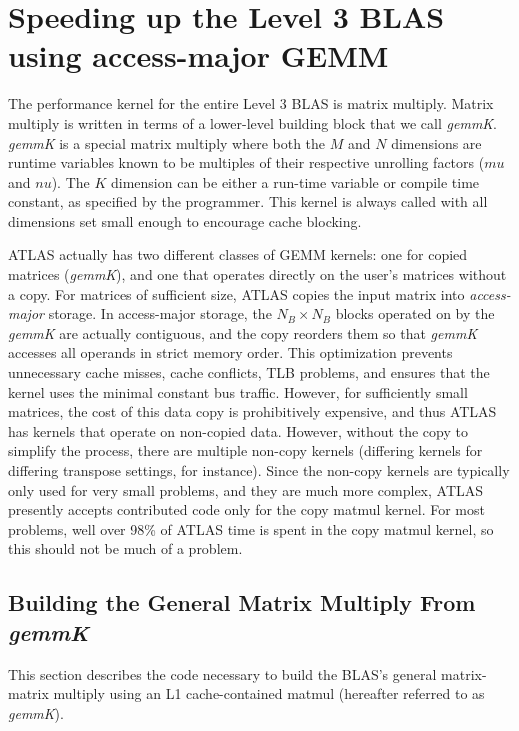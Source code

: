 \documentclass[11pt]{article}
\begin{document}
\section{Speeding up the Level 3 BLAS using access-major GEMM}

The performance kernel for the entire Level 3 BLAS is matrix multiply.
Matrix multiply is written in terms of a lower-level building block that
we call {\it gemmK}.  {\it gemmK} is a special matrix multiply where
both the $M$ and $N$ dimensions are runtime variables known to be multiples
of their respective unrolling factors ($mu$ and $nu$).  The $K$ dimension
can be either a run-time variable or compile time constant, as specified
by the programmer.  This kernel is always called with all dimensions set
small enough to encourage cache blocking.

ATLAS actually has two different classes of GEMM kernels: one for copied
matrices ({\it gemmK}), and one that operates directly on the user's matrices
without a copy.  For matrices of
sufficient size, ATLAS copies the input matrix into {\em access-major} storage.
In access-major storage, the $N_B \times N_B$ blocks operated on by the
{\it gemmK} are actually contiguous, and the copy reorders them so that
{\it gemmK} accesses all operands in strict memory order.  This optimization
prevents unnecessary cache misses, cache conflicts, TLB problems, and ensures
that the kernel uses the minimal constant bus traffic.  However, for
sufficiently
small matrices, the cost of this data copy is prohibitively expensive,
and thus ATLAS has kernels that operate on non-copied data.  However,
without the copy to simplify the process, there are multiple non-copy
kernels (differing kernels for differing transpose settings, for instance).
Since the non-copy kernels are typically only used for very small problems,
and they are much more complex, ATLAS presently accepts contributed code
only for the copy matmul kernel.  For most problems, well over 98\% of ATLAS
time is spent in the copy matmul kernel, so this should not be much of 
a problem.

\subsection{Building the General Matrix Multiply From {\it gemmK}}
\label{sec-buildMM}

This section describes the code necessary to build the BLAS's general
matrix-matrix multiply using an L1 cache-contained
matmul (hereafter referred to as {\it gemmK}).
\end{document}

